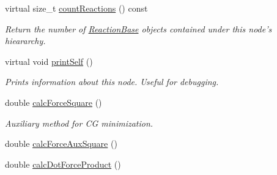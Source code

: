 \begin{DoxyCompactItemize}
virtual size\+\_\+t \hyperlink{classComponent_a446ee3fa9e36a6b56642a9d2a14d983d}{count\+Reactions} () const 
\begin{DoxyCompactList}\small\item\em Return the number of \hyperlink{classReactionBase}{Reaction\+Base} objects contained under this node's hieararchy. \end{DoxyCompactList}\item 
virtual void \hyperlink{classComponent_a871fbdc783ea600ed667dd37eb8adf1e}{print\+Self} ()
\begin{DoxyCompactList}\small\item\em Prints information about this node. Useful for debugging. \end{DoxyCompactList}\end{DoxyCompactItemize}
{\bf }\par
\begin{DoxyCompactItemize}
\item 
double \hyperlink{classBead_a8f10459bad94f72599f2e239644c4421}{calc\+Force\+Square} ()
\begin{DoxyCompactList}\small\item\em Auxiliary method for C\+G minimization. \end{DoxyCompactList}\item 
double \hyperlink{classBead_a82e3c084cb26f343b5de59619c854f2b}{calc\+Force\+Aux\+Square} ()
\item 
double \hyperlink{classBead_a3df6e55d379663d002c73651a24718f5}{calc\+Dot\+Force\+Product} ()
\end{DoxyCompactItemize}

